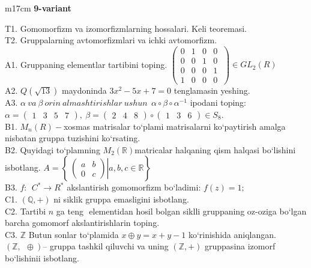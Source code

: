 \documentclass{article}
\begin{document}
\begin{tabular}{m{17cm}}
\textbf{9-variant}
\newline

T1. Gomomorfizm va izomorfizmlarning hossalari. Keli teoremasi. \\
T2. Gruppalarning avtomorfizmlari va ichki avtomorfizm. \\
A1. Gruppaning elementlar tartibini toping. \(\left( \begin{matrix}
0 & 1 & 0 & 0 \\
0 & 0 & 1 & 0 \\
0 & 0 & 0 & 1 \\
1 & 0 & 0 & 0
\end{matrix}\  \right) \in GL_{2}(R)\) \\
A2. \(Q(\sqrt{13})\) maydoninda \(3x^{2} - 5x + 7 = 0\) tenglamasin yeshing. \\
A3. \(\alpha\ va\ \beta\ orin\ almashtirishlar\ ushun\ \ \alpha \circ \beta \circ \alpha^{- 1}\) ipodani toping:\(\alpha = \begin{pmatrix}
1 & 3 & 5 & 7
\end{pmatrix},\ \beta = \begin{pmatrix}
2 & 4 & 8
\end{pmatrix} \circ \begin{pmatrix}
1 & 3 & 6
\end{pmatrix} \in S_{8}\). \\
B1. \(M_{n}(R) -\)xosmas matrisalar to`plami matrisalarni ko`paytirish amalga nisbatan gruppa tuzishini ko`rsating. \\
B2. Quyidagi to`plamning \(M_{2}(\mathbb{R})\)matricalar halqaning qism halqasi bo`lishini isbotlang. \(A = \left\{ \left. \ \begin{pmatrix}
a & b \\
0 & c
\end{pmatrix} \right|a,b,c\mathbb{\in R} \right\}\) \\
B3. \(f:\ \ C^{*} \rightarrow R^{*}\) akslantirish gomomorfizm bo`ladimi: \(f(z) = 1;\) \\
C1. \((\mathbb{Q}, + )\) ni siklik gruppa emasligini isbotlang. \\
C2. Tartibi \(n\) ga teng \(< a >\) elementidan hosil bo\textquotesingle lgan siklli gruppaning o\textquotesingle z-o\textquotesingle ziga bo`lgan barcha gomomorf akslantirishlarin toping. \\
C3. \(\mathbb{Z}\) Butun sonlar to`plamida \(x \oplus y = x + y - 1\) ko`rinishida aniqlangan. \((\mathbb{Z},\ \  \oplus )\)-- gruppa tashkil qiluvchi va uning \((\mathbb{Z}, + )\) gruppasina izomorf bo`lishinii isbotlang. \\

\end{tabular}
\vspace{1cm}
\end{document}

